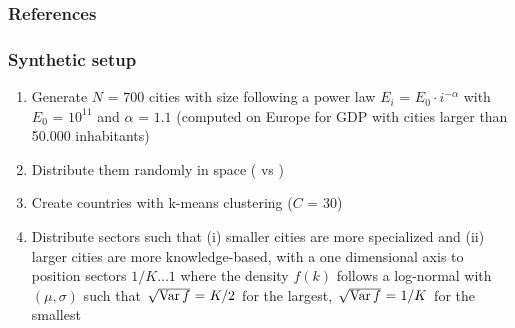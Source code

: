\begin{frame}[allowframebreaks]
\frametitle{References}


\end{frame}





\begin{frame}[label=syntheticsetup]

\frametitle{Synthetic setup}

\begin{enumerate}
    \item Generate $N \textrm{ = } 700$ cities with size following a power law $E_i \textrm{ = } E_0 \cdot i^{-\alpha}$ with $E_0 \textrm{ = } 10^{11}$ and $\alpha \textrm{ = } 1.1$ (computed on Europe for GDP with cities larger than 50.000 inhabitants)
    \item Distribute them randomly in space (\cite{simini2019testing} vs \cite{banos2011christaller})
    \item Create countries with k-means clustering ($C \textrm{ = } 30$)
    \item Distribute sectors such that (i) smaller cities are more specialized and (ii) larger cities are more knowledge-based, with a one dimensional axis to position sectors $1/K \ldots 1$ where the density $f\left(k\right)$ follows a log-normal with $\left(\mu,\sigma\right)$ such that $\sqrt{\operatorname{Var} f} \textrm{ = } K/2$ for the largest, $\sqrt{\operatorname{Var} f} \textrm{ = } 1/K$ for the smallest
\end{enumerate}

\hyperlink{setupmain}{}

\end{frame}


